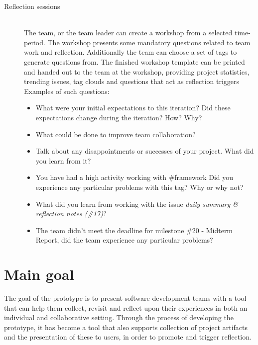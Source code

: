 \begin{description}
	\item[Reflection sessions] \hfill \\
	The team, or the team leader can create a workshop from a selected time-period. The workshop presents some mandatory questions
	related to team work and reflection. Additionally the team can choose a set of tags to generate questions from. The finished workshop template can be printed and handed out to the team at the workshop, providing project statistics, trending issues, tag clouds and questions that act as reflection triggers\\
	Examples of such questions: 
		\begin{itemize}
			\item What were your initial expectations to this iteration? Did these expectations change during the iteration? How? Why?
			\item What could be done to improve team collaboration?
			\item Talk about any disappointments or successes of your project. What did you learn from it?
			\item You have had a high activity working with \#framework Did you experience any particular problems with this tag? Why or why not?
			\item What did you learn from working with the issue \textit{daily summary \& reflection notes (\#17)}?
			\item The team didn't meet the deadline for milestone \#20 - Midterm Report, did the team experience any particular problems?
		\end{itemize}
\end{description}

\section{Main goal}
The goal of the prototype is to present software development teams with a tool that can help them collect, revisit and reflect upon their experiences in both an individual and collaborative setting. Through the process of developing the prototype, it has become a tool that also supports collection of project artifacts and the presentation of these to users, in order to promote and trigger reflection. 
